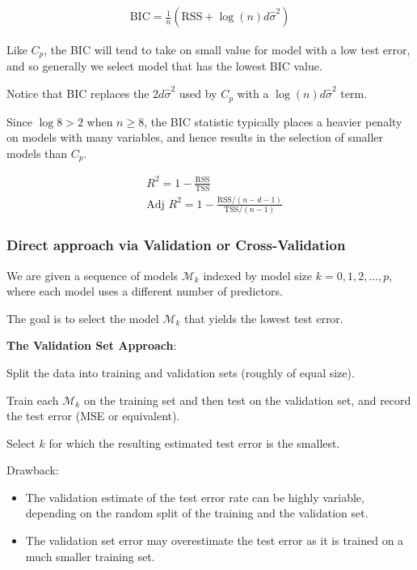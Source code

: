 \begin{align*}
    \text{BIC} = \frac{1}{n}(\text{RSS}+\log(n)d\widehat{\sigma}^2)
\end{align*}

Like $C_p$, the BIC will tend to take on small value for model with a low test error, and so generally we select model that has the lowest BIC value. 

Notice that BIC replaces the $2d\widehat{\sigma}^2$ used by $C_p$ with a $\log(n)d\widehat{\sigma}^2$ term.

Since $\log 8 > 2$ when $n\geq 8$, the BIC statistic typically places a heavier penalty on models with many variables, and hence results in the selection of smaller models than $C_p$.

\bigskip

\begin{align*}
    & R^2 = 1-\frac{\text{RSS}}{\text{TSS}}\\
    & \text{Adj }R^2 = 1-\frac{\text{RSS}/(n-d-1)}{\text{TSS}/(n-1)}
\end{align*}

\subsubsection{Direct approach via Validation or Cross-Validation}

\indent 

We are given a sequence of models $\mathcal{M}_k$ indexed by model size $k=0,1,2,\ldots,p$, where each model uses a different number of predictors. 

The goal is to select the model $\mathcal{M}_k$ that yields the lowest test error.

\bigskip

\noindent\textbf{The Validation Set Approach}:

Split the data into training and validation sets (roughly of equal size).

Train each $\mathcal{M}_k$  on the training set and then test on the validation set, and record the test error (MSE or equivalent).

Select $k$ for which the resulting estimated test error is the smallest.

\noindent Drawback:

\begin{itemize}
    \item The validation estimate of the test error rate can be highly variable, depending on the random split of the training and the validation set.
    \item The validation set error may overestimate the test error as it is trained on a much smaller training set.
\end{itemize}

